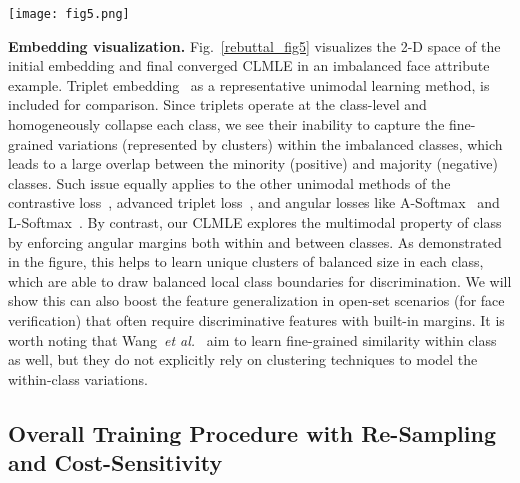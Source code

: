 \documentclass[10pt,journal,compsoc]{IEEEtran}
\newcommand{\etal}{\emph{et al.}}
\begin{document}
\begin{figure*}[t]
\begin{center}
\texttt{[image: fig5.png]}
\end{center}
\vspace{-1.5em}
\caption{The 2-D feature space using t-SNE~\cite{tsne} and pairwise feature similarity for one binary face attribute from the CelebA dataset~\cite{liu15}. We only show 2 Positive Clusters (PC) and 5 Negative Clusters (NC) to represent the class imbalance. The embedding of a pre-trained model, our CLMLE, and triplet embedding are compared. We can see that between-class clusters (with different colors) are well separated in CLMLE, but they are overlapped in triplet embedding, leading to overlapping binary score distributions.}
\label{rebuttal_fig5}
\end{figure*}

\noindent
{\bf Embedding visualization.} Fig.~\ref{rebuttal_fig5} visualizes the 2-D space of the initial embedding and final converged CLMLE in an imbalanced face attribute example. Triplet embedding~\cite{Schroff15} as a representative unimodal learning method, is included for comparison. Since triplets operate at the class-level and homogeneously collapse each class, we see their inability to capture the fine-grained variations (represented by clusters) within the imbalanced classes, which leads to a large overlap between the minority (positive) and majority (negative) classes. Such issue equally applies to the other unimodal methods of the contrastive loss~\cite{Yi14}, advanced triplet loss~\cite{NIPS6200}, and angular losses like A-Softmax~\cite{liu2017sphereface} and L-Softmax~\cite{Liu2016}. By contrast, our CLMLE explores the multimodal property of class by enforcing angular margins both within and between classes. As demonstrated in the figure, this helps to learn unique clusters of balanced size in each class, which are able to draw balanced local class boundaries for discrimination. We will show this can also boost the feature generalization in open-set scenarios (for face verification) that often require discriminative features with built-in margins. It is worth noting that Wang~\etal~\cite{Jiang14} aim to learn fine-grained similarity within class as well, but they do not explicitly rely on clustering techniques to model the within-class variations.

\subsection{Overall Training Procedure with Re-Sampling and Cost-Sensitivity}
\end{document}

